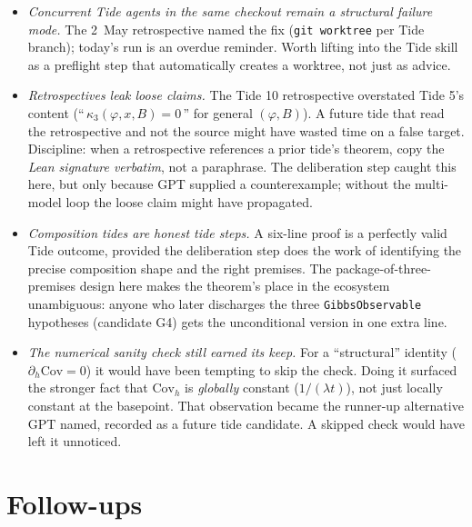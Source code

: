 \documentclass[11pt]{article}
\begin{document}
\begin{itemize}
\item \emph{Concurrent Tide agents in the same checkout
remain a structural failure mode.} The 2~May retrospective named the
fix (\texttt{git worktree} per Tide branch); today's run is an
overdue reminder. Worth lifting into the Tide skill as a preflight
step that automatically creates a worktree, not just as advice.

\item \emph{Retrospectives leak loose claims.} The Tide 10
retrospective overstated Tide 5's content (``\,$\kappa_3(\varphi, x, B)=0$\,''
for general $(\varphi, B)$). A future tide that read the retrospective
and not the source might have wasted time on a false target. Discipline:
when a retrospective references a prior tide's theorem, copy the
\emph{Lean signature verbatim}, not a paraphrase. The deliberation
step caught this here, but only because GPT supplied a
counterexample; without the multi-model loop the loose claim might
have propagated.

\item \emph{Composition tides are honest tide steps.} A six-line
proof is a perfectly valid Tide outcome, provided the deliberation
step does the work of identifying the precise composition shape and
the right premises. The package-of-three-premises design here makes
the theorem's place in the ecosystem unambiguous: anyone who later
discharges the three \texttt{GibbsObservable} hypotheses
(candidate G4) gets the unconditional version in one extra line.

\item \emph{The numerical sanity check still earned its keep.} For a
``structural'' identity ($\partial_h \mathrm{Cov} = 0$) it would have
been tempting to skip the check. Doing it surfaced the stronger fact
that $\mathrm{Cov}_h$ is \emph{globally} constant ($1/(\lambda t)$),
not just locally constant at the basepoint. That observation
became the runner-up alternative GPT named, recorded as a future
tide candidate. A skipped check would have left it unnoticed.
\end{itemize}

\section{Follow-ups}
\end{document}
